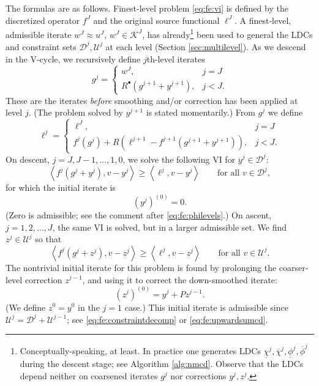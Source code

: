 \documentclass[letterpaper,final,12pt,reqno]{amsart}
\theoremstyle{cstyle}
\theoremstyle{cstyle*}
\theoremstyle{dstyle}
\numberwithin{equation}{section}
\numberwithin{figure}{section}
\numberwithin{table}{section}
\numberwithin{theorem}{section}
\newcommand{\ip}[2]{\left<#1,#2\right>}
\newcommand{\iR}{R^{\bullet}}
\begin{document}
The formulas are as follows.  Finest-level problem \eqref{eq:fe:vi} is defined by the discretized operator $f^J$ and the original source functional $\ell^J$.  A finest-level, admissible iterate $w^J \approx u^J$, $w^J \in \mathcal{K}^J$, has already\footnote{Conceptually-speaking, at least.  In practice one generates LDCs $\underline{\chi}^j,\overline{\chi}^j,\underline{\phi}^j,\overline{\phi}^j$ during the descent stage; see Algorithm \ref{alg:nmcd}.  Observe that the LDCs depend neither on coarsened iterates $g^j$ nor corrections $y^j,z^j$.} been used to general the LDCs and constraint sets $\mathcal{D}^j,\mathcal{U}^j$ at each level (Section \ref{sec:multilevel}).  As we descend in the V-cycle, we recursively define $j$th-level iterates
\begin{equation}
g^j = \begin{cases} w^J, & j=J \\
                    \iR(g^{j+1} + y^{j+1}), & j < J.
      \end{cases}  \label{eq:fe:defineg}
\end{equation}
These are the iterates \emph{before} smoothing and/or correction has been applied at level $j$.  (The problem solved by $y^{j+1}$ is stated momentarily.)  From $g^j$ we define
\begin{equation}
\ell^j = \begin{cases} \ell^J, & j=J \\
                       f^j(g^j) + R\left(\ell^{j+1}-f^{j+1}(g^{j+1}+y^{j+1})\right), & j<J. \end{cases} \label{eq:fe:levelsource}
\end{equation}
On descent, $j=J,J-1,\dots,1,0$, we solve the following VI for $y^j \in \mathcal{D}^j$:
\begin{equation}
\ip{f^j(g^j + y^j)}{v-y^j} \ge \ip{\ell^j}{v-y^j} \qquad \text{for all } v\in \mathcal{D}^j, \label{eq:fe:downvi}
\end{equation}
for which the initial iterate is
\begin{equation}
(y^j)^{(0)}=0.  \label{eq:fe:downwardinitial}
\end{equation}
(Zero is admissible; see the comment after \eqref{eq:fe:philevels}.)  On ascent, $j=1,2,\dots,J$, the same VI is solved, but in a larger admissible set.  We find $z^j \in \mathcal{U}^j$ so that
\begin{equation}
\ip{f^j(g^j + z^j)}{v-z^j} \ge \ip{\ell^j}{v-z^j} \qquad \text{for all } v\in \mathcal{U}^j. \label{eq:fe:upvi}
\end{equation}
The nontrivial initial iterate for this problem is found by prolonging the coarser-level correction $z^{j-1}$, and using it to correct the down-smoothed iterate:
\begin{equation}
(z^j)^{(0)} = y^j + P z^{j-1}.  \label{eq:fe:upwardinitial}
\end{equation}
(We define $z^0=y^0$ in the $j=1$ case.)  This initial iterate is admissible since $\mathcal{U}^j = \mathcal{D}^j + \mathcal{U}^{j-1}$; see \eqref{eq:fe:constraintdecomp} or \eqref{eq:fe:upwardsumcd}.
\end{document}
